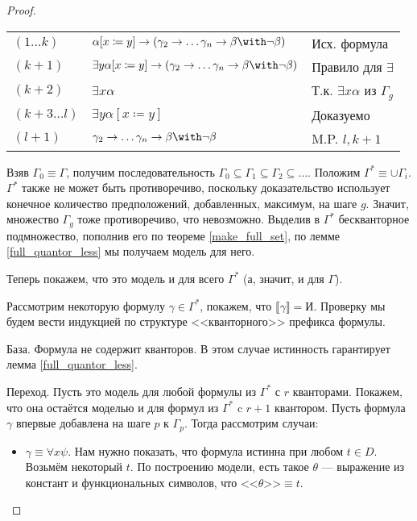 \begin{proof}
\begin{itemize}
\begin{tabular}{lll}
$(1 \dots k)$ & $\alpha [x \coloneqq  y] \rightarrow (\gamma_2 \rightarrow \dots \gamma_n \rightarrow \beta \with \neg \beta)$ & Исх. формула\\
$(k+1)$ & $\exists y \alpha [x \coloneqq  y] \rightarrow (\gamma_2 \rightarrow \dots \gamma_n \rightarrow \beta \with \neg \beta)$ & Правило для $\exists$\\
$(k+2)$ & $\exists x \alpha$ & Т.к. $\exists x \alpha$ из $\Gamma_g$ \\
$(k+3 \dots l)$ & $\exists y \alpha [x \coloneqq  y]$ & Доказуемо \\
$(l+1)$ & $\gamma_2 \rightarrow \dots \gamma_n \rightarrow \beta \with \neg \beta$ & M.P. $l, k+1$
\end{tabular}

\end{itemize}

Взяв $\Gamma_0 \equiv \Gamma$, получим последовательность
$\Gamma_0 \subseteq \Gamma_1 \subseteq \Gamma_2 \subseteq \dots$. Положим
$\Gamma^* \equiv \cup \Gamma_i$.
$\Gamma^*$ также не может быть противоречиво, поскольку доказательство
использует конечное количество предположений, добавленных, максимум, на шаге $g$. Значит,
множество $\Gamma_g$ тоже противоречиво, что невозможно.
Выделив в $\Gamma^*$ бескванторное подмножество, 
пополнив его по теореме \ref{make_full_set}, по лемме \ref{full_quantor_less}
мы получаем модель для него.

Теперь покажем, что это модель и для всего $\Gamma^*$ (а, значит, и для $\Gamma$).

Рассмотрим некоторую формулу $\gamma \in \Gamma^*$,
покажем, что $\llbracket \gamma \rrbracket = \texttt{И}$.
Проверку мы будем вести индукцией по структуре <<кванторного>> префикса формулы. 

База. Формула не содержит кванторов. В этом случае истинность гарантирует лемма
\ref{full_quantor_less}. 

Переход. Пусть это модель для любой формулы из $\Gamma^*$ с $r$ кванторами.
Покажем, что она остаётся моделью и для формул из $\Gamma^*$ c $r+1$ квантором.
Пусть формула $\gamma$ впервые добавлена на шаге $p$ к $\Gamma_p$. 
Тогда рассмотрим случаи:

\begin{itemize}
\item $\gamma \equiv \forall x \psi$. 
Нам нужно показать, что формула истинна при любом $t \in D$. 
Возьмём некоторый $t$. По построению модели, есть такое $\theta$ ---
выражение из констант и функциональных символов, что 
$\texttt{<<} \theta \texttt{>>} \equiv t$. 


\end{itemize}
\end{proof}
